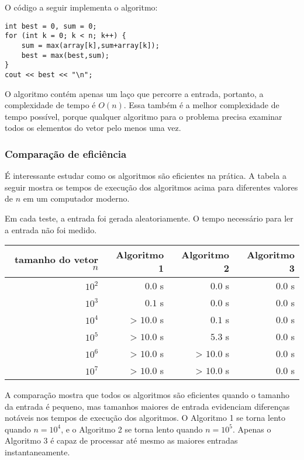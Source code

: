 O código a seguir implementa o algoritmo:
\begin{lstlisting}
int best = 0, sum = 0;
for (int k = 0; k < n; k++) {
    sum = max(array[k],sum+array[k]);
    best = max(best,sum);
}
cout << best << "\n";
\end{lstlisting}

O algoritmo contém apenas um laço 
que percorre a entrada, 
portanto, a complexidade de tempo é $O(n)$. 
Essa também é a melhor complexidade de tempo possível, 
porque qualquer algoritmo para o problema 
precisa examinar todos os elementos do vetor pelo menos uma vez.

\subsubsection{Comparação de eficiência}

É interessante estudar como os 
algoritmos são eficientes na prática. 
A tabela a seguir mostra os tempos de execução 
dos algoritmos acima para diferentes 
valores de $n$ em um computador moderno.

Em cada teste, a entrada foi gerada aleatoriamente. 
O tempo necessário para ler a entrada não foi 
medido.

\begin{center}
\begin{tabular}{rrrr}
tamanho do vetor $n$ & Algoritmo 1 & Algoritmo 2 & Algoritmo 3 \\
\hline
$10^2$ & $0.0$ s & $0.0$ s & $0.0$ s \\
$10^3$ & $0.1$ s & $0.0$ s & $0.0$ s \\
$10^4$ & > $10.0$ s & $0.1$ s & $0.0$ s \\
$10^5$ & > $10.0$ s & $5.3$ s & $0.0$ s \\
$10^6$ & > $10.0$ s & > $10.0$ s & $0.0$ s \\
$10^7$ & > $10.0$ s & > $10.0$ s & $0.0$ s \\
\end{tabular}
\end{center}

A comparação mostra que todos os algoritmos 
são eficientes quando o tamanho da entrada é pequeno, 
mas tamanhos maiores de entrada evidenciam 
diferenças notáveis nos tempos de execução dos algoritmos. 
O Algoritmo 1 se torna lento 
quando $n=10^4$, e o Algoritmo 2 
se torna lento quando $n=10^5$. 
Apenas o Algoritmo 3 é capaz de processar 
até mesmo as maiores entradas instantaneamente.
